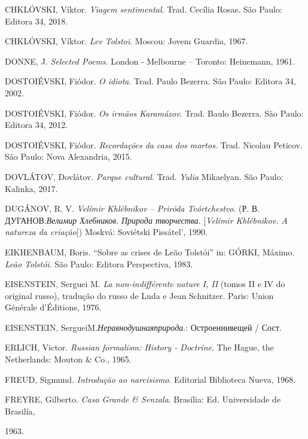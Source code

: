 {CHKLÓVSKI, Víktor. \emph{Viagem sentimental}. Trad. Cecília Rosas. São
Paulo: Editora 34, 2018.

CHKLÓVSKI, Víktor. \emph{Lev Tolstoi}. Moscou: Jovem Guardia, 1967.

DONNE, J. \emph{Selected Poems}. London - Melbourne -- Toronto:
Heinemann, 1961.

DOSTOIÉVSKI, Fiódor. \emph{O idiota}. Trad. Paulo Bezerra. São Paulo:
Editora 34, 2002.

DOSTOIÉVSKI, Fiódor. \emph{Os irmãos Karamázov}. Trad. Baulo Bezerra.
São Paulo: Editora 34, 2012.

DOSTOIÉVSKI, Fiódor\emph{. Recordações da casa dos mortos}. Trad.
Nicolau Peticov. São Paulo: Nova Alexandria, 2015.

DOVLÁTOV, Dovlátov. \emph{Parque cultural}. Trad.
\emph{Yulia} Mikaelyan. São Paulo: Kalinka, 2017.

DUGÁNOV, R. V. \emph{Velímir Khlébnikov -- Priróda Tvórtchestvo}. (Р. В.
ДУГАНОВ.\emph{Велимир Хлебников}. \emph{Природа творчества}.
{[}\emph{Velímir Khlébnikov. A natureza da criação}{]}) Moskvá:
Soviétski Pissátel', 1990.

EIKHENBAUM, Boris. ``Sobre as crises de Leão Tolstói'' in: GÓRKI,
Máximo. \emph{Leão Tolstói}. São Paulo: Editora Perspectiva, 1983.

EISENSTEIN, Serguei M. \emph{La non-indifférente nature I, II} (tomos II
e IV do original russo), tradução do russo de Luda e Jean Schnitzer.
Paris: Union Générale d'Éditions, 1976.

EISENSTEIN, SergueiM.\emph{Неравнодушнаяприрода}.: Остроениивещей /
Сост.

ERLICH, Victor. \emph{Russian formalism: History - Doctrine}. The Hague,
the Netherlands: Mouton \& Co., 1965.

FREUD, Sigmund. \emph{Introdução ao narcisismo}. Editorial Biblioteca
Nueva, 1968.

FREYRE, Gilberto. \emph{Casa Grande \& Senzala}. Brasília: Ed.
Universidade de Brasilía,

1963.

}
